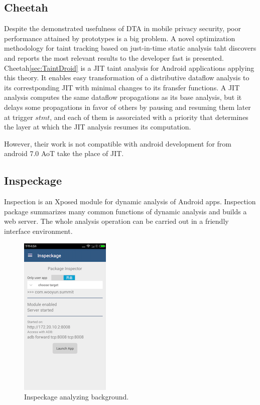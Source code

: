 \documentclass{article}
\begin{document}
\subsection{Cheetah}
Despite the demonstrated usefulness of DTA in mobile privacy security, poor performance attained by prototypes is a big problem. A novel optimization methodology for taint tracking based on just-in-time static analysis taht discovers and reports the most relevant results to the developer fast is presented. Cheetah\ref{sec:TaintDroid} is a JIT taint analysis for Android applications applying this theory. It enables easy transformation of a distributive dataflow analysis to its correstponding JIT with minimal changes to its fransfer functions. A JIT analysis computes the same dataflow propagations as its base analysis, but it delays some propagations in favor of others by pausing and resuming them later at trigger $stmt$, and each of them is assorciated with a priority that determines the layer at which the JIT analysis resumes its computation.

However, their work is not compatible with android development for from android 7.0 AoT take the place of JIT.
\subsection{Inspeckage}
Inspection is an Xposed module for dynamic analysis of Android apps. Inspection package summarizes many common functions of dynamic analysis and builds a web server. The whole analysis operation can be carried out in a friendly interface environment.

\begin{figure}[ht]
  \centering
  \includegraphics[scale=0.6]{inspeckage1.png}
  \caption{Inspeckage analyzing background.}
  \label{fig:inspeckage1}
\end{figure}
\end{document}
